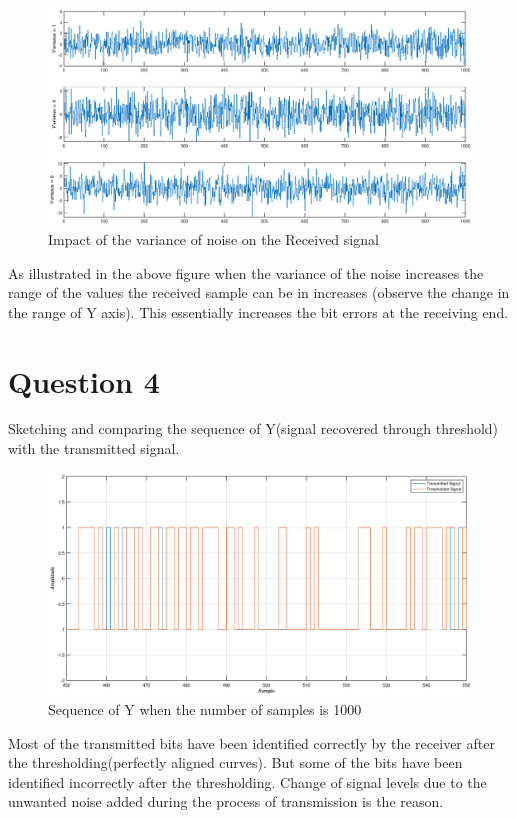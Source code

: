 \documentclass[a4paper,11pt]{article}%
\begin{document}
\begin{figure}[!h]
	\centering
	\includegraphics[scale=0.45]{figures/q3f2}
	\caption{Impact of the variance of noise on the Received signal}
\end{figure}

As illustrated in the above figure when the variance of the noise increases the range of the values the received sample can  be in increases (observe the change in the range of Y axis). This essentially increases the bit errors at the receiving end.

\pagebreak
\section{Question 4}
Sketching and comparing the sequence of Y(signal recovered through threshold) with the transmitted signal.
\begin{figure}[!h]
	\centering
	\includegraphics[scale=0.4]{figures/q4f1}
	\caption{Sequence of Y when the number of samples is 1000}
\end{figure}

Most of the transmitted bits have been identified correctly by the receiver after the thresholding(perfectly aligned curves). But some of the bits have been identified incorrectly after the thresholding. Change of signal levels due to the unwanted noise added during the process of transmission is the reason.
\end{document}
